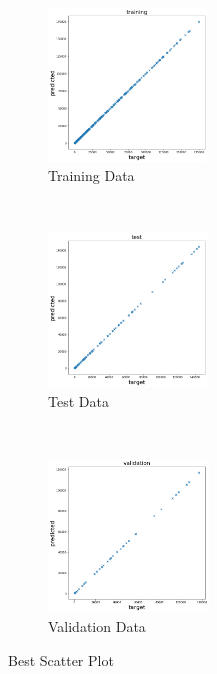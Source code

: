  \begin{figure}[!ht]
     \centering
     \begin{subfigure}[t]{0.30\textwidth}
         \centering
         \includegraphics[height=1.6in]{Task 2 Images/best_scatterplot_batch_500_degree_6_lambda_0_training.png}
         \caption{Training Data}
     \end{subfigure}%
     ~ 
     \begin{subfigure}[t]{0.30\textwidth}
         \centering
         \includegraphics[height=1.6in]{Task 2 Images/best_scatterplot_batch_500_degree_6_lambda_0_test.png}
         \caption{Test Data }
     \end{subfigure}%
     ~
     \begin{subfigure}[t]{0.30\textwidth}
         \centering
         \includegraphics[height=1.6in]{Task 2 Images/best_scatterplot_batch_500_degree_6_lambda_0_validation.png}
         \caption{Validation Data }
     \end{subfigure}
     \caption{Best Scatter Plot}
     \label{fig:16}
\end{figure}
